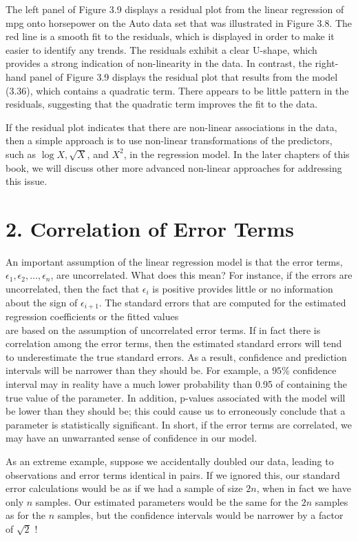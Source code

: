 \documentclass[10pt]{article}
\begin{document}
The left panel of Figure 3.9 displays a residual plot from the linear regression of mpg onto horsepower on the Auto data set that was illustrated in Figure 3.8. The red line is a smooth fit to the residuals, which is displayed in order to make it easier to identify any trends. The residuals exhibit a clear U-shape, which provides a strong indication of non-linearity in the data. In contrast, the right-hand panel of Figure 3.9 displays the residual plot that results from the model (3.36), which contains a quadratic term. There appears to be little pattern in the residuals, suggesting that the quadratic term improves the fit to the data.

If the residual plot indicates that there are non-linear associations in the data, then a simple approach is to use non-linear transformations of the predictors, such as $\log X, \sqrt{X}$, and $X^{2}$, in the regression model. In the later chapters of this book, we will discuss other more advanced non-linear approaches for addressing this issue.

\section*{2. Correlation of Error Terms}
An important assumption of the linear regression model is that the error terms, $\epsilon_{1}, \epsilon_{2}, \ldots, \epsilon_{n}$, are uncorrelated. What does this mean? For instance, if the errors are uncorrelated, then the fact that $\epsilon_{i}$ is positive provides little or no information about the sign of $\epsilon_{i+1}$. The standard errors that are computed for the estimated regression coefficients or the fitted values\\
are based on the assumption of uncorrelated error terms. If in fact there is correlation among the error terms, then the estimated standard errors will tend to underestimate the true standard errors. As a result, confidence and prediction intervals will be narrower than they should be. For example, a $95 \%$ confidence interval may in reality have a much lower probability than 0.95 of containing the true value of the parameter. In addition, p-values associated with the model will be lower than they should be; this could cause us to erroneously conclude that a parameter is statistically significant. In short, if the error terms are correlated, we may have an unwarranted sense of confidence in our model.

As an extreme example, suppose we accidentally doubled our data, leading to observations and error terms identical in pairs. If we ignored this, our standard error calculations would be as if we had a sample of size $2 n$, when in fact we have only $n$ samples. Our estimated parameters would be the same for the $2 n$ samples as for the $n$ samples, but the confidence intervals would be narrower by a factor of $\sqrt{2}$ !
\end{document}
